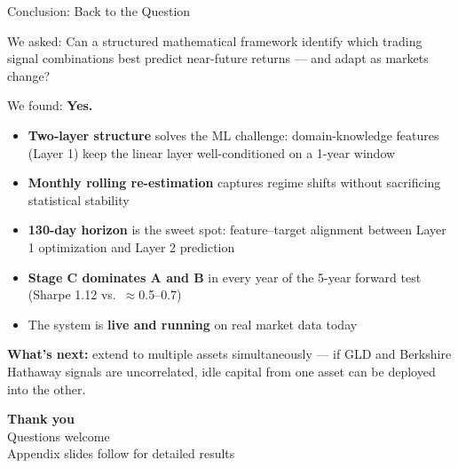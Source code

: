 \documentclass[aspectratio=169]{beamer}
\begin{document}
\begin{frame}{Conclusion: Back to the Question}

  \begin{block}{We asked:}
    Can a structured mathematical framework identify which trading signal
    combinations best predict near-future returns --- and adapt as markets change?
  \end{block}

  \vspace{0.5em}
  \begin{block}{We found: \textbf{Yes.}}
    \begin{itemize}
      \item \textbf{Two-layer structure} solves the ML challenge: domain-knowledge features
            (Layer 1) keep the linear layer well-conditioned on a 1-year window
      \item \textbf{Monthly rolling re-estimation} captures regime shifts without
            sacrificing statistical stability
      \item \textbf{130-day horizon} is the sweet spot: feature--target alignment
            between Layer 1 optimization and Layer 2 prediction
      \item \textbf{Stage C dominates A and B} in every year of the 5-year forward test
            (Sharpe 1.12 vs.\ $\approx$0.5--0.7)
      \item The system is \textbf{live and running} on real market data today
    \end{itemize}
  \end{block}

  \vspace{0.3em}
  \textbf{What's next:} extend to multiple assets simultaneously ---
  if GLD and Berkshire Hathaway signals are uncorrelated,
  idle capital from one asset can be deployed into the other.

\end{frame}

\begin{frame}{}
  \begin{center}
    \vspace{1cm}
    {\Large \textbf{Thank you}}\\[1em]
    {\normalsize Questions welcome}\\[2em]
    {\small Appendix slides follow for detailed results}
  \end{center}
\end{frame}
\end{document}
